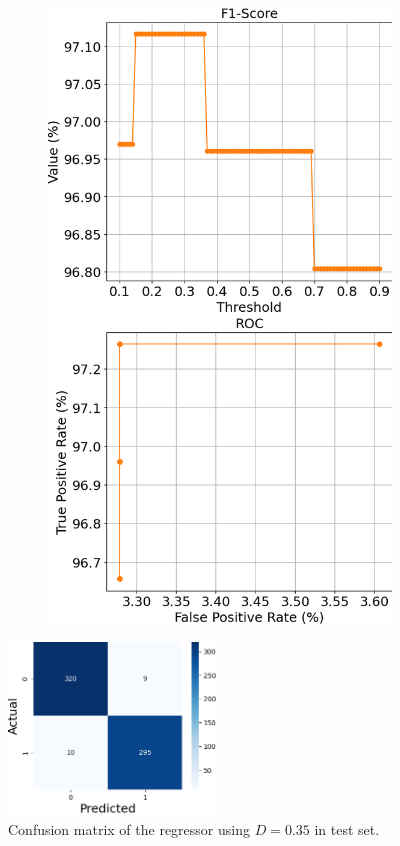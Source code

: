 \begin{figure}[htbp]
\begin{subfigure}[t]{.33\textwidth}
    \end{subfigure}
\hfill
    \begin{subfigure}[t]{.33\textwidth}
        \centering 
        \caption{}
        \label{fig:results-testing}
        \includegraphics[width=\linewidth]{../../python_code/plots/logistic_regression/results-test.png}
    \end{subfigure}
\hfill\!
\end{figure} 

\begin{figure}[htb]
    \centering 
    \caption{
        Confusion matrix of the regressor using $D=0.35$ in test set.
    }
    \label{fig:confusion-matrix}
    \includegraphics[width=5.5cm]{../../python_code/plots/logistic_regression/results-confusion_matrix.png}
\end{figure} 
